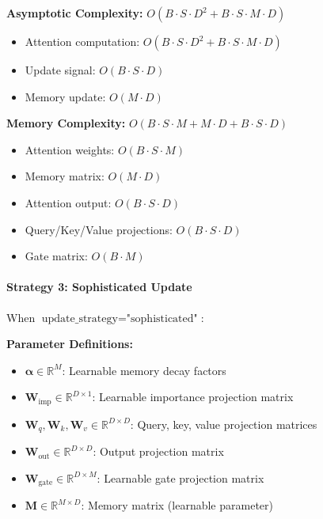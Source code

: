 \documentclass{article}
\begin{document}
\begin{enumerate}
\textbf{Asymptotic Complexity:} $O(B \cdot S \cdot D^2 + B \cdot S \cdot M \cdot D)$
\begin{itemize}
\item Attention computation: $O(B \cdot S \cdot D^2 + B \cdot S \cdot M \cdot D)$
\item Update signal: $O(B \cdot S \cdot D)$
\item Memory update: $O(M \cdot D)$
\end{itemize}

\textbf{Memory Complexity:} $O(B \cdot S \cdot M + M \cdot D + B \cdot S \cdot D)$
\begin{itemize}
\item Attention weights: $O(B \cdot S \cdot M)$
\item Memory matrix: $O(M \cdot D)$
\item Attention output: $O(B \cdot S \cdot D)$
\item Query/Key/Value projections: $O(B \cdot S \cdot D)$
\item Gate matrix: $O(B \cdot M)$
\end{itemize}
\end{enumerate}

\paragraph{Strategy 3: Sophisticated Update}

When $\text{update\_strategy} = \text{"sophisticated"}$:

\textbf{Parameter Definitions:}
\begin{itemize}
\item $\boldsymbol{\alpha} \in \mathbb{R}^{M}$: Learnable memory decay factors
\item $\mathbf{W}_{\text{imp}} \in \mathbb{R}^{D \times 1}$: Learnable importance projection matrix
\item $\mathbf{W}_q, \mathbf{W}_k, \mathbf{W}_v \in \mathbb{R}^{D \times D}$: Query, key, value projection matrices
\item $\mathbf{W}_{\text{out}} \in \mathbb{R}^{D \times D}$: Output projection matrix
\item $\mathbf{W}_{\text{gate}} \in \mathbb{R}^{D \times M}$: Learnable gate projection matrix
\item $\mathbf{M} \in \mathbb{R}^{M \times D}$: Memory matrix (learnable parameter)
\end{itemize}
\end{document}
